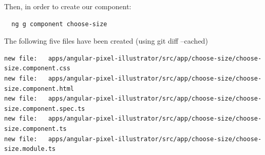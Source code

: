Then, in order to create our component:
\begin{verbatim}
  ng g component choose-size
\end{verbatim}
The following five files have been created (using git diff --cached)
\begin{lstlisting}[breaklines]
new file:   apps/angular-pixel-illustrator/src/app/choose-size/choose-size.component.css
new file:   apps/angular-pixel-illustrator/src/app/choose-size/choose-size.component.html
new file:   apps/angular-pixel-illustrator/src/app/choose-size/choose-size.component.spec.ts
new file:   apps/angular-pixel-illustrator/src/app/choose-size/choose-size.component.ts
new file:   apps/angular-pixel-illustrator/src/app/choose-size/choose-size.module.ts
\end{lstlisting}

